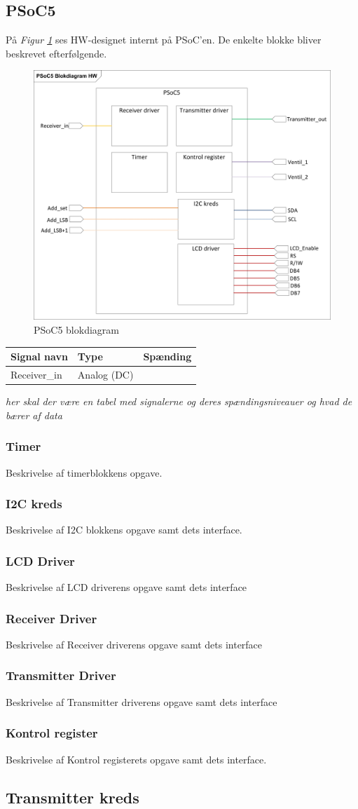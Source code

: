 \subsection{PSoC5}
På \textit{Figur \ref{fig:PSoCBlok}} ses HW-designet internt på PSoC'en. De enkelte blokke bliver beskrevet efterfølgende.
\begin{figure}[H]
\centering
\includegraphics[width=.75\textwidth]{billeder/PSoCBlock}
\caption{PSoC5 blokdiagram}
\label{fig:PSoCBlok}
\end{figure}
\begin{tabular}{l|l|l}
\cellcolor[gray]{0.85}Signal navn& \cellcolor[gray]{0.85}Type &\cellcolor[gray]{0.85}Spænding\\ \hline
Receiver\_in & Analog (DC) & 



\end{tabular}
\textit{her skal der være en tabel med signalerne og deres spændingsniveauer og hvad de bærer af data}
\subsubsection{Timer}
Beskrivelse af timerblokkens opgave.
\subsubsection{I2C kreds}
Beskrivelse af I2C blokkens opgave samt dets interface.
\subsubsection{LCD Driver}
Beskrivelse af LCD driverens opgave samt dets interface
\subsubsection{Receiver Driver}
Beskrivelse af Receiver driverens opgave samt dets interface
\subsubsection{Transmitter Driver}
Beskrivelse af Transmitter driverens opgave samt dets interface
\subsubsection{Kontrol register}
Beskrivelse af Kontrol registerets opgave samt dets interface.

\subsection{Transmitter kreds}

